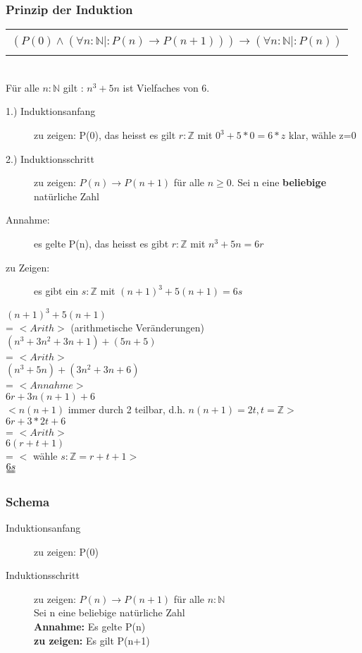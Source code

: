 \documentclass[a4paper,10pt]{article}
\newcommand{\NN}{\mathbb{N}} %
\newcommand{\ZN}{\mathbb{Z}} %
\newcommand{\Bold}[1]{\textbf{#1}} %
\newcommand{\ra}{\rightarrow}
\begin{document}
\subsubsection{Prinzip der Induktion}
\begin{tabular}{| c |}
	\hline \\
		$(P(0) \wedge (\forall n : \NN | : P(n) \ra P(n+1))) \ra (\forall n : \NN | : P(n))$ \\ \\
	\hline
\end{tabular} \\
F\"ur alle $n:\NN$ gilt : $n^3+5n$ ist Vielfaches von 6. \\
\begin{description}
	\item[1.) Induktionsanfang] zu zeigen: P(0), das heisst es gilt $r:\ZN$ mit $0^3+5*0=6*z$ klar, w\"ahle z=0
	\item[2.) Induktionsschritt] zu zeigen: $P(n) \ra P(n+1)$ f\"ur alle $n \geq 0$. Sei n eine \Bold {beliebige} nat\"urliche Zahl \\
	\item[Annahme:] es gelte P(n), das heisst es gibt $r:\ZN$ mit $n^3+5n =6r$ 
	\item[zu Zeigen:] es gibt ein $s:\ZN$ mit $(n+1)^3+5(n+1)=6s$
\end{description}
$(n+1)^3 + 5(n+1)$  \\ = $<Arith>$ (arithmetische Ver\"anderungen) \\
$(n^3+3n^2+3n +1)+(5n+5)$ \\ = $<Arith>$ \\
$(n^3+5n) + (3n^2+3n+6)$ \\ = $<Annahme>$ \\
$6r + 3n(n+1)+6$ \\ $<n(n+1)$ immer durch 2 teilbar, d.h. $n(n+1)=2t, t=\ZN>$ \\
$6r +3*2t + 6$ \\ = $<Arith>$ \\
$6(r+t+1)$ \\ = $<$ w\"ahle $s:\ZN=r+t+1>$ \\ $\uuline{6s}$ 

\subsubsection{Schema}
\begin{description}
	\item[Induktionsanfang] zu zeigen: P(0)
	\item[Induktionsschritt] zu zeigen: $P(n) \ra P(n+1)$ f\"ur alle $n:\NN$ \\
		Sei n eine beliebige nat\"urliche Zahl \\
		\Bold {Annahme:} Es gelte P(n) \\
		\Bold {zu zeigen:} Es gilt P(n+1)
\end{description}
\end{document}
